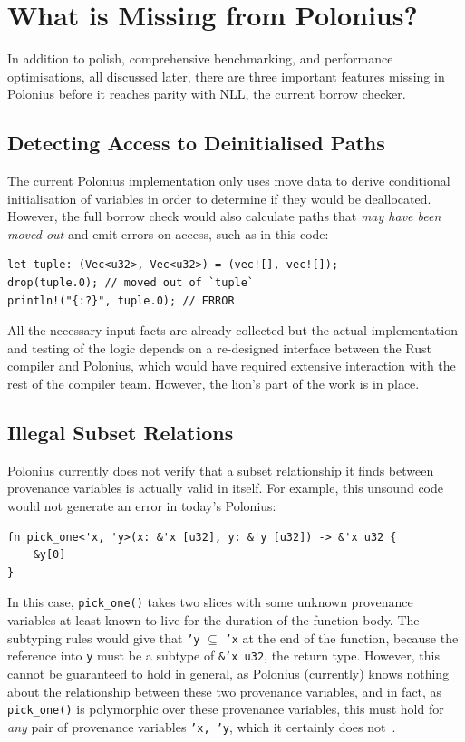 \documentclass[11pt,a4paper,twoside,openany,draft]{report}
\newcommand{\InRust}[1]{\texttt{#1}}
\begin{document}
\section{What is Missing from Polonius?}\label{sec:missing-features}

In addition to polish, comprehensive benchmarking, and performance
optimisations, all discussed later, there are three important features missing
in Polonius before it reaches parity with NLL, the current borrow checker.

\subsection{Detecting Access to Deinitialised Paths}
\label{sec:missing-features:move}

The current Polonius implementation only uses move data to derive conditional
initialisation of variables in order to determine if they would be deallocated.
However, the full borrow check would also calculate paths that \emph{may have
  been moved out} and emit errors on access, such as in this code:
\begin{verbatim}
let tuple: (Vec<u32>, Vec<u32>) = (vec![], vec![]);
drop(tuple.0); // moved out of `tuple`
println!("{:?}", tuple.0); // ERROR
\end{verbatim}

All the necessary input facts are already collected but the actual
implementation and testing of the logic depends on a re-designed interface
between the Rust compiler and Polonius, which would have required extensive
interaction with the rest of the compiler team. However, the lion's part of the
work is in place.

\subsection{Illegal Subset Relations}
\label{sec:missing-features:illegal-subset-relations}

Polonius currently does not verify that a subset relationship it finds between
provenance variables is actually valid in itself. For example, this unsound code
would not generate an error in today's Polonius:
\begin{verbatim}
fn pick_one<'x, 'y>(x: &'x [u32], y: &'y [u32]) -> &'x u32 {
    &y[0]
}
\end{verbatim}

In this case, \InRust{pick_one()} takes two slices with some unknown provenance
variables at least known to live for the duration of the function body. The
subtyping rules would give that \InRust{'y} $\subseteq$ \InRust{'x} at the end
of the function, because the reference into \InRust{y} must be a subtype of
\InRust{&'x u32}, the return type. However, this cannot be guaranteed to hold in
general, as Polonius (currently) knows nothing about the relationship between
these two provenance variables, and in fact, as \InRust{pick_one()} is
polymorphic over these provenance variables, this must hold for \emph{any} pair
of provenance variables \InRust{'x, 'y}, which it certainly does
not~\cite{matsakis_polonius_2019-1}.
\end{document}
